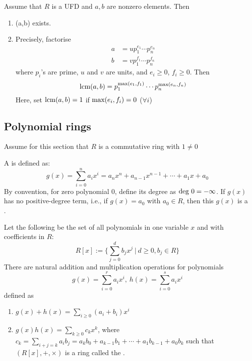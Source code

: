 \begin{proposition}
Assume that $R$ is a UFD and $a,b$ are nonzero elements. Then
\begin{enumerate}[label=(\roman*)]
\item \lcms(a,b) exists.
\item Precisely, factorise
\begin{align}
a &= u p_1^{e_1} \cdots p_n^{e_n} \nonumber \\
b &= v p_1^{f_1} \cdots p_n^{f_n} \nonumber
\end{align}
where $p_i$'s are prime, $u$ and $v$ are units, and $e_i \geq 0$, $f_i \geq 0$. Then
\begin{equation}
\textnormal{lcm}(a,b) = p_1^{\textnormal{max}(e_1, f_1)} \cdots p_n^{\textnormal{max}(e_n, f_n)} \nonumber
\end{equation}
Here, set $\textnormal{lcm}(a,b) = 1$ if $\textnormal{max}(e_i, f_i) = 0$ ($\forall i$)
\end{enumerate}
\end{proposition}

\subsection{Polynomial rings}

Assume for this section that $R$ is a commutative ring with $1 \neq 0$
\begin{definition}
A  is defined as:
\begin{equation}
g(x) = \sum_{i=0}^{n} a_i x^i = a_n x^n + a_{n-1} x^{n-1} + \cdots + a_1 x + a_0 \nonumber
\end{equation}
By convention, for zero polynomial $0$, define its degree as $\textnormal{deg}\ 0 = - \infty$.
If $g(x)$ has no positive-degree term, i.e., if $g(x) = a_0$ with $a_0 \in R$, then this $g(x)$ is a .
\end{definition}

\begin{remark}
Let the following be the set of all polynomials in one variable $x$ and with coefficients in $R$:
\begin{equation}
R[x] := \{\sum_{j=0}^{d} b_j x^j \ | \ d \geq 0, b_j \in R\} \nonumber
\end{equation}
There are natural addition and multiplication operations for polynomials
\begin{equation}
g(x) = \sum_{i=0}^{r} a_i x^i, \ h(x) = \sum_{i=0}^{s} a_i x^i \nonumber
\end{equation}
defined as
\begin{enumerate}[label=(\roman*)]
\item $g(x) + h(x) = \sum_{i \geq 0} (a_i + b_i)x^i$
\item $g(x)h(x) = \sum_{k \geq 0} c_k x^k$, where $c_k = \sum_{i+j = k} a_i b_j = a_k b_0 + a_{k-1} b_1 + \cdots + a_1 b_{k-1} + a_0 b_k$ such that $(R[x], +, \times)$ is a ring called the .
\end{enumerate}
\end{remark}


